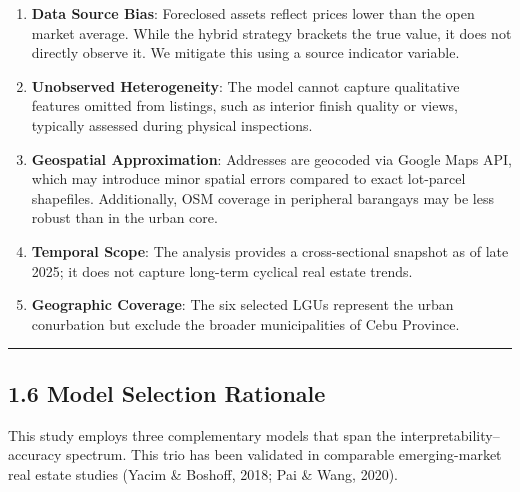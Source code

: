 \begin{enumerate}
\item \textbf{Data Source Bias}: Foreclosed assets reflect prices lower than the open market average. While the hybrid strategy brackets the true value, it does not directly observe it. We mitigate this using a source indicator variable.
\item \textbf{Unobserved Heterogeneity}: The model cannot capture qualitative features omitted from listings, such as interior finish quality or views, typically assessed during physical inspections.
\item \textbf{Geospatial Approximation}: Addresses are geocoded via Google Maps API, which may introduce minor spatial errors compared to exact lot-parcel shapefiles. Additionally, OSM coverage in peripheral barangays may be less robust than in the urban core.
\item \textbf{Temporal Scope}: The analysis provides a cross-sectional snapshot as of late 2025; it does not capture long-term cyclical real estate trends.
\item \textbf{Geographic Coverage}: The six selected LGUs represent the urban conurbation but exclude the broader municipalities of Cebu Province.
\end{enumerate}

\begin{center}\rule{0.5\linewidth}{0.5pt}\end{center}

\subsection{\texorpdfstring{\textbf{1.6 Model Selection Rationale}}{1.6 Model Selection Rationale}}\label{model-selection-rationale}

This study employs three complementary models that span the interpretability--accuracy spectrum. This trio has been validated in comparable emerging-market real estate studies (Yacim \& Boshoff, 2018; Pai \& Wang, 2020).

